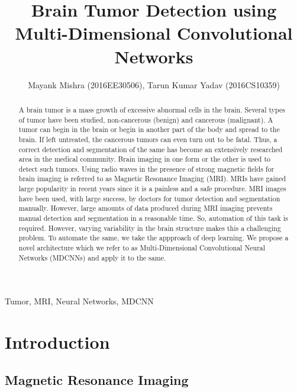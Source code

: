 \documentclass[journal]{IEEEtran}
\begin{document}
\title{Brain Tumor Detection using Multi-Dimensional Convolutional Networks}

\author{Mayank Mishra (2016EE30506), Tarun Kumar Yadav (2016CS10359)}

\maketitle

\begin{abstract}
A brain tumor is a mass growth of excessive abnormal cells in the brain. Several types of tumor have been studied, non-cancerous (benign) and cancerous (malignant). A tumor can begin in the brain or begin in another part of the body and spread to the brain. If left untreated, the cancerous tumors can even turn out to be fatal. Thus, a correct detection and segmentation of the same has become an extensively researched area in the medical community. Brain imaging in one form or the other is used to detect such tumors. Using radio waves in the presence of strong magnetic fields for brain imaging is referred to as Magnetic Resonance Imaging (MRI). MRIs have gained large popularity in recent years since it is a painless and a safe procedure. MRI images have been used, with large success, by doctors for tumor detection and segmentation manually. However, large amounts of data produced during MRI imaging prevents manual detection and segmentation in a reasonable time. So, automation of this task is required. However, varying variability in the brain structure makes this a challenging problem. To automate the same, we take the appproach of deep learning. We propose a novel architecture which we refer to as Multi-Dimensional Convolutional Neural Networks (MDCNNs) and apply it to the same.
\end{abstract}

\begin{IEEEkeywords}
Tumor, MRI, Neural Networks, MDCNN
\end{IEEEkeywords}

\section{Introduction}

\subsection{Magnetic Resonance Imaging}
\end{document}
